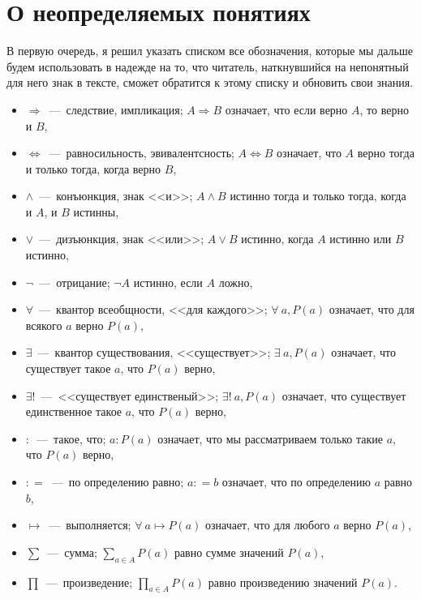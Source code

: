 \section{О неопределяемых понятиях}

	В первую очередь, я решил указать списком все обозначения, которые мы дальше будем использовать в надежде на то, что читатель, наткнувшийся на непонятный для него знак в тексте, сможет обратится к этому списку и обновить свои знания.
\begin{itemize}
\item $\Rightarrow$~---~следствие, импликация; $A \Rightarrow B$ означает, что если верно $A$, то верно и $B$,
\item $\Leftrightarrow$~---~равносильность, эвивалентсность; $A \Leftrightarrow B$ означает, что $A$ верно тогда и только тогда, когда верно $B$, 
\item $\wedge$~---~конъюнкция, знак <<и>>; $A \wedge B$ истинно тогда и только тогда, когда и $A$, и $B$ истинны,
\item $\vee$~---~дизъюнкция, знак <<или>>; $A \vee B$ истинно, когда $A$ истинно или $B$ истинно,
\item $\neg$~---~отрицание; $\neg A$ истинно, если $A$ ложно,
\item $\forall$~---~квантор всеобщности, <<для каждого>>; $\forall \!\ a, P(a)$ означает, что для всякого $a$ верно $P(a)$,
\item $\exists$~---~квантор существования, <<существует>>; $\exists \!\ a, P(a)$ означает, что существует такое $a$, что $P(a)$ верно,
\item $\exists!$~---~<<существует единственый>>; $\exists! \!\ a, P(a)$ означает, что существует единственное такое $a$, что $P(a)$ верно,
\item $\colon$~---~такое, что; $a: P(a)$ означает, что мы рассматриваем только такие $a$, что $P(a)$ верно,
\item $\colon=$~---~по определению равно; $a \colon = b$ означает, что по определению $a$ равно $b$,
\item $\mapsto$~---~выполняется; $\forall \!\ a \mapsto P(a)$ означает, что для любого $a$ верно $P(a)$,
\item $\displaystyle\sum$~---~сумма; $\displaystyle\sum_{a \in A} P(a)$ равно сумме значений $P(a)$,
\item $\displaystyle\prod$~---~произведение; $\displaystyle\prod_{a \in A} P(a)$ равно произведению значений $P(a)$.
\end{itemize}

